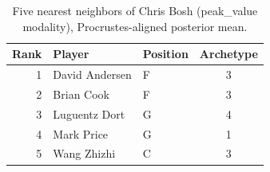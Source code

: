 \begin{table}[htbp]
  \centering\small
  \begin{tabular}{rllc}
    \toprule
    Rank & Player & Position & Archetype \\
    \midrule
    1 & David Andersen & F & 3 \\
    2 & Brian Cook & F & 3 \\
    3 & Luguentz Dort & G & 4 \\
    4 & Mark Price & G & 1 \\
    5 & Wang Zhizhi & C & 3 \\
    \bottomrule
  \end{tabular}
  \caption{Five nearest neighbors of Chris Bosh (peak_value modality), Procrustes-aligned posterior mean.}
  \label{tab:Chris_Bosh_neighbors_peak_value}
\end{table}


